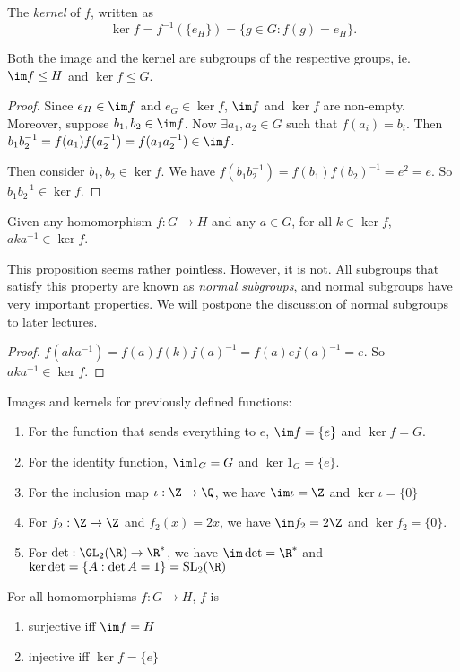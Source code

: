 \documentclass[a4paper]{article}
\begin{document}
\begin{defi}
  The \emph{kernel} of $f$, written as
  \[
    \ker f = f^{-1}(\{e_H\}) = \{g\in G:f(g)=e_H\}.
  \]
\end{defi}

\begin{prop}
  Both the image and the kernel are subgroups of the respective groups, ie. $\im f\leq H$ and $\ker f \leq G$.
\end{prop}

\begin{proof}
  Since $e_H\in \im f$ and $e_G\in \ker f$, $\im f$ and $\ker f$ are non-empty. Moreover, suppose $b_1, b_2\in \im f$. Now $\exists a_1, a_2 \in G$ such that $f(a_i) = b_i$. Then $b_1b_2^{-1} = f(a_1)f(a_2^{-1}) = f(a_1a_2^{-1})\in \im f$.

  Then consider $b_1,b_2\in \ker f$. We have $f(b_1b_2^{-1}) = f(b_1)f(b_2)^{-1} = e^2 = e$. So $b_1b_2^{-1}\in \ker f$.
\end{proof}

\begin{prop}
  Given any homomorphism $f:G\rightarrow H$ and any $a\in G$, for all $k\in \ker f$, $aka^{-1}\in\ker f$.
\end{prop}
This proposition seems rather pointless. However, it is not. All subgroups that satisfy this property are known as \emph{normal subgroups}, and normal subgroups have very important properties. We will postpone the discussion of normal subgroups to later lectures.

\begin{proof}
  $f(aka^{-1}) = f(a)f(k)f(a)^{-1} = f(a)ef(a)^{-1} = e$. So $aka^{-1}\in \ker f$.
\end{proof}

\begin{eg}
  Images and kernels for previously defined functions:
  \begin{enumerate}
    \item For the function that sends everything to $e$, $\im f = \{e\}$ and $\ker f = G$.
    \item For the identity function, $\im 1_G = G$ and $\ker 1_G = \{e\}$.
    \item For the inclusion map $\iota: \Z\rightarrow\Q$, we have $\im \iota = \Z$ and $\ker \iota = \{0\}$
    \item For $f_2:\Z\rightarrow\Z$ and $f_2(x) = 2x$, we have $\im f_2 = 2\Z$ and $\ker f_2 = \{0\}$.
    \item For $\det: \GL_2(\R) \rightarrow \R^*$, we have $\im \det = \R^*$ and $\ker \det = \{A:\det A = 1\} = \mathrm{SL}_2(\R)$
  \end{enumerate}
\end{eg}
\begin{prop}
  For all homomorphisms $f:G\rightarrow H$, $f$ is
  \begin{enumerate}
    \item surjective iff $\im f = H$
    \item injective iff $\ker f = \{e\}$
  \end{enumerate}
\end{prop}
\end{document}
